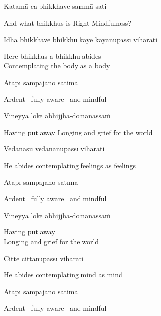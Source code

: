 Katamā ca bhikkhave sammā-sati

\begin{cprenglish}
  And what bhikkhus is Right Mindfulness?
\end{cprenglish}

Idha bhikkhave bhikkhu kāye kāyānupassī viharati

\begin{cprenglish}
  Here bhikkhus a bhikkhu abides\\
  Contemplating the body as a body
\end{cprenglish}

Ātāpī sampajāno satimā

\begin{cprenglish}
  Ardent \breathmark\ fully aware \breathmark\ and mindful
\end{cprenglish}

Vineyya loke abhijjhā-domanassaṁ

\begin{cprenglish}
  Having put away
  Longing and grief for the world
\end{cprenglish}

Vedanāsu vedanānupassī viharati

\begin{cprenglish}
  He abides contemplating feelings as feelings
\end{cprenglish}

Ātāpī sampajāno satimā

\begin{cprenglish}
  Ardent \breathmark\ fully aware \breathmark\ and mindful
\end{cprenglish}

Vineyya loke abhijjhā-domanassaṁ

\begin{cprenglish}
  Having put away\\
  Longing and grief for the world
\end{cprenglish}

Citte cittānupassī viharati

\begin{cprenglish}
  He abides contemplating mind as mind
\end{cprenglish}

Ātāpī sampajāno satimā

\begin{cprenglish}
  Ardent \breathmark\ fully aware \breathmark\ and mindful
\end{cprenglish}

